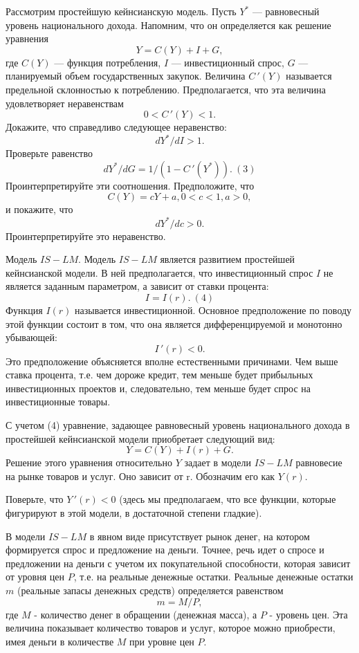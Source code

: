 \begin{exer}
    Рассмотрим  простейшую кейнсианскую модель. Пусть $Y^{*}$
    --- равновесный уровень национального дохода. Напомним, что он определяется
    как решение уравнения
    \[Y=C(Y)+I+G,\]
    где $C(Y)$ --- функция потребления, $I$ --- инвестиционный спрос,
    $G$ --- планируемый объем государственных закупок. Величина $C\,'(Y)$
    называется предельной склонностью к потреблению. Предполагается, что
    эта величина удовлетворяет неравенствам
    \[0<C\,'(Y)<1.\]
    Докажите, что справедливо следующее неравенство:
    \[dY^{*}/dI>1.\]
    Проверьте равенство
    \[dY^{*}/dG=1/(1-C\,'(Y^{*})). \  (3)\]
    Проинтерпретируйте эти соотношения.
    Предположите, что
    \[C(Y)=cY+a, 0<c<1, a>0,\]
    и покажите, что
    \[dY^{*}/dc>0.\]
    Проинтерпретируйте это неравенство.
\end{exer}


        Модель $IS-LM$.
    Модель $IS-LM$ является развитием простейшей кейнсианской
    модели. В ней предполагается, что инвестиционный спрос $I$
    не является заданным параметром, а зависит от ставки процента:
    \[I=I(r). \ (4)\]
    Функция $I(r)$ называется инвестиционной. Основное
    предположение по поводу этой функции состоит в том, что она является
    дифференцируемой и монотонно убывающей:
    \[I\,'(r)<0.\]
    Это предположение объясняется вполне естественными причинами. Чем
    выше ставка процента, т.е. чем дороже кредит, тем меньше будет
    прибыльных инвестиционных проектов и, следовательно, тем меньше
    будет спрос на инвестиционные товары.

    С учетом (4) уравнение, задающее равновесный уровень
    национального дохода в простейшей кейнсианской модели
    приобретает следующий вид:
    \[Y=C(Y)+I(r)+G.\]
    Решение этого уравнения относительно $Y$  задает в модели
    $IS-LM$ равновесие на рынке товаров и услуг. Оно зависит от r.
    Обозначим его как $Y(r)$.

\begin{exer}
    Поверьте, что $Y\,'(r)<0$ (здесь мы предполагаем, что все функции,
    которые фигурируют в этой модели, в достаточной степени
    гладкие).
\end{exer}


    В модели $IS-LM$ в явном виде присутствует рынок денег, на котором
    формируется спрос и предложение на деньги. Точнее, речь идет о
    спросе и предложении на деньги с учетом их покупательной способности,
    которая зависит от уровня цен $P$, т.е. на реальные денежные остатки.
    Реальные денежные остатки $m$ (реальные запасы денежных средств)
    определяется равенством
    \[m=M/P,\]
    где $M$ - количество денег в обращении (денежная масса), а $P$ - уровень
    цен. Эта величина показывает количество товаров и услуг, которое
    можно приобрести, имея деньги в количестве $M$ при уровне цен $P$.

